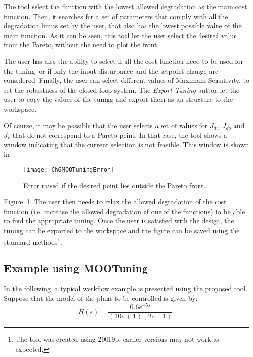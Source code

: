 The tool select the function with the lowest allowed degradation as the main cost function. Then, it searches for a set of parameters that comply with all the degradation limits set by the user, that also has the lowest possible value of the main function. As it can be seen, this tool let the user select the desired value from the Pareto, without the need to plot the front.

The user has also the ability to select if all the cost function need to be used for the tuning, or if only the input disturbance and the setpoint change are considered. Finally, the user can select different values of Maximum Sensitivity, to set the robustness of the closed-loop system. The \textit{Export Tuning} button let the user to copy the values of the tuning and export them as an structure to the \matlab{} workspace.

Of course, it may be possible that the user selects a set of values for $J_{di}$, $J_{do}$ and $J_r$ that do not correspond to a Pareto point. In that case, the tool shows a window indicating that the current selection is not feasible. This window is shown in %
%
\begin{figure}[tb]
	\centering
	\texttt{[image: Ch6MOOTuningError]}
	\caption{Error raised if the desired point lies outside the Pareto front.}
	\label{fig:Ch6MOOTuningError}
\end{figure}
%
Figure~\ref{fig:Ch6MOOTuningError}. The user then needs to relax the allowed degradation of the cost function (i.e. increase the allowed degradation of one of the functions) to be able to find the appropriate tuning. Once the user is satisfied with the design, the tuning can be exported to the \matlab{} workspace and the figure can be saved using the standard \matlab{} methods\footnote{The tool was created using \matlab{} 20019b, earlier versions may not work as expected.}.

\subsection{Example using MOOTuning}
\label{sec:MOOTuningExample}
In the following, a typical workflow example is presented using the proposed tool. Suppose that the model of the plant to be controlled is given by:
\begin{equation}
	H(s) = \frac{0.6 e^{-5s}}{(10 s + 1)(2 s +1)}.
	\label{eq:ModeloEjemploMOO}
\end{equation}

